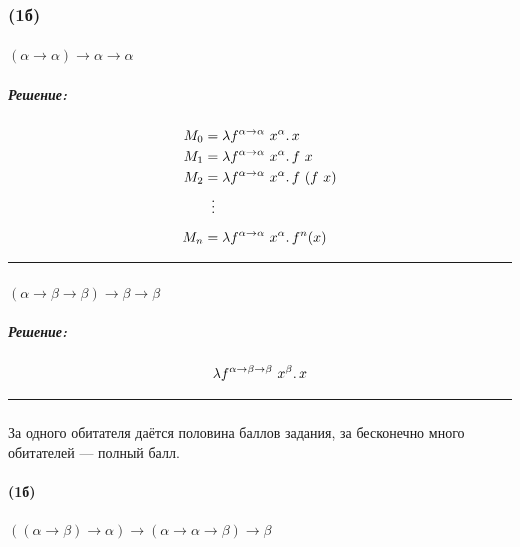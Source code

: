 \documentclass{article}
\newenvironment{proof}{\subparagraph{\hspace{-1em}Решение:\newline}}{\par\noindent\rule{\textwidth}{0.4pt}}
\begin{document}
    \subsubsection{(1б)}

    \paragraph{} $(\alpha \to \alpha) \to \alpha \to \alpha$

    \begin{proof}
        \[
            \begin{aligned}
                M_0 &= \lambda f^{\alpha \to \alpha}~x^\alpha \ldotp x \\
                M_1 &= \lambda f^{\alpha \to \alpha}~x^\alpha \ldotp f~x \\
                M_2 &= \lambda f^{\alpha \to \alpha}~x^\alpha \ldotp f~(f~x) \\
                &\;\;\vdots \\[2mm]
                M_n &= \lambda f^{\alpha \to \alpha}~x^\alpha \ldotp f^n(x)
            \end{aligned}
        \]
    \end{proof}

    \paragraph{} $(\alpha \to \beta \to \beta) \to \beta \to \beta$

    \begin{proof}
        \[
            \lambda f^{\alpha \to \beta \to \beta}~x^\beta \ldotp x
        \]
    \end{proof}

    \subsubsection{}

    За одного обитателя даётся половина баллов задания, за бесконечно много обитателей --- полный балл.

    \paragraph{(1б)} $((\alpha \to \beta) \to \alpha) \to (\alpha \to \alpha \to \beta) \to \beta$
\end{document}

